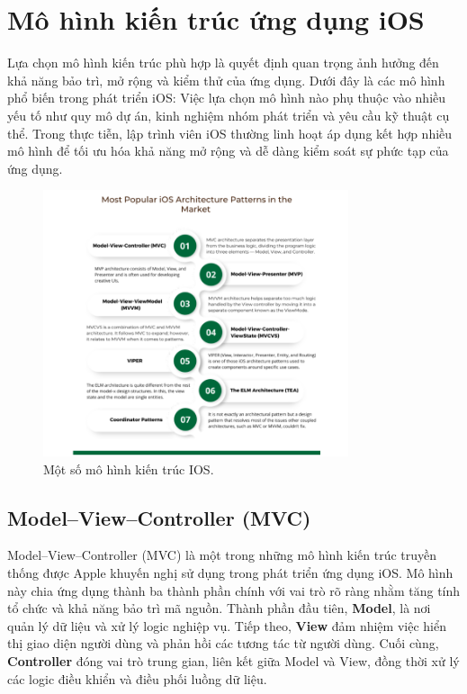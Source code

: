 \section{Mô hình kiến trúc ứng dụng iOS}
Lựa chọn mô hình kiến trúc phù hợp là quyết định quan trọng ảnh hưởng đến khả năng bảo trì, mở rộng và kiểm thử của ứng dụng. Dưới đây là các mô hình phổ biến trong phát triển iOS:
Việc lựa chọn mô hình nào phụ thuộc vào nhiều yếu tố như quy mô dự án, kinh nghiệm nhóm phát triển và yêu cầu kỹ thuật cụ thể. Trong thực tiễn, lập trình viên iOS thường linh hoạt áp dụng kết hợp nhiều mô hình để tối ưu hóa khả năng mở rộng và dễ dàng kiểm soát sự phức tạp của ứng dụng.

\begin{figure}[H] 
    \centering
    \includegraphics[width=0.8\textwidth]{images/mohinhkientrucios.png}
     \caption{Một số mô hình kiến trúc IOS\cite{MôHinhIOS}.}
    \label{fig:mohinhkientrucios}
\end{figure}
\subsection{Model–View–Controller (MVC)}
  Model–View–Controller (MVC) là một trong những mô hình kiến trúc truyền thống được Apple khuyến nghị sử dụng trong phát triển ứng dụng iOS. Mô hình này chia ứng dụng thành ba thành phần chính với vai trò rõ ràng nhằm tăng tính tổ chức và khả năng bảo trì mã nguồn.
  Thành phần đầu tiên, \textbf{Model}, là nơi quản lý dữ liệu và xử lý logic nghiệp vụ. Tiếp theo, \textbf{View} đảm nhiệm việc hiển thị giao diện người dùng và phản hồi các tương tác từ người dùng. Cuối cùng, \textbf{Controller} đóng vai trò trung gian, liên kết giữa Model và View, đồng thời xử lý các logic điều khiển và điều phối luồng dữ liệu.

